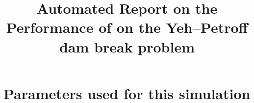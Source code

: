 \documentclass[11pt,a4paper]{article}%
\begin{document}
 

\title{Automated Report on the Performance of \anuga{} on the Yeh--Petroff dam break problem}
\maketitle




\section{Parameters used for this simulation}






\end{document}
